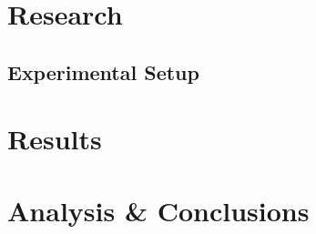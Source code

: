 \documentclass{uvamscse}	%
\begin{document}
\chapter{Research}

\section{Experimental Setup}

\chapter{Results}

\chapter{Analysis \& Conclusions}





\newpage

\end{document}
